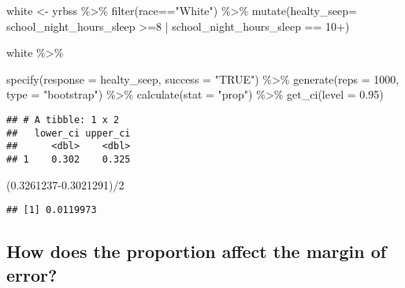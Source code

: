 \documentclass[
]{article}
\newenvironment{Shaded}{\begin{snugshade}}{\end{snugshade}}
\newcommand{\AttributeTok}[1]{\textcolor[rgb]{0.77,0.63,0.00}{#1}}
\newcommand{\DecValTok}[1]{\textcolor[rgb]{0.00,0.00,0.81}{#1}}
\newcommand{\FloatTok}[1]{\textcolor[rgb]{0.00,0.00,0.81}{#1}}
\newcommand{\FunctionTok}[1]{\textcolor[rgb]{0.00,0.00,0.00}{#1}}
\newcommand{\NormalTok}[1]{#1}
\newcommand{\OtherTok}[1]{\textcolor[rgb]{0.56,0.35,0.01}{#1}}
\newcommand{\SpecialCharTok}[1]{\textcolor[rgb]{0.00,0.00,0.00}{#1}}
\newcommand{\StringTok}[1]{\textcolor[rgb]{0.31,0.60,0.02}{#1}}
\begin{document}
\begin{Shaded}
\begin{Highlighting}[]
\NormalTok{white }\OtherTok{\textless{}{-}}\NormalTok{  yrbss }\SpecialCharTok{\%\textgreater{}\%}
  \FunctionTok{filter}\NormalTok{(race}\SpecialCharTok{==}\StringTok{"White"}\NormalTok{) }\SpecialCharTok{\%\textgreater{}\%} 
  \FunctionTok{mutate}\NormalTok{(}\AttributeTok{healty\_seep=}\NormalTok{ school\_night\_hours\_sleep }\SpecialCharTok{\textgreater{}=}\DecValTok{8} \SpecialCharTok{|}\NormalTok{ school\_night\_hours\_sleep }\SpecialCharTok{==} \StringTok{\textquotesingle{}10+\textquotesingle{}}\NormalTok{)}
  
\NormalTok{white }\SpecialCharTok{\%\textgreater{}\%}
  
\FunctionTok{specify}\NormalTok{(}\AttributeTok{response =}\NormalTok{ healty\_seep, }\AttributeTok{success =} \StringTok{"TRUE"}\NormalTok{) }\SpecialCharTok{\%\textgreater{}\%}
  \FunctionTok{generate}\NormalTok{(}\AttributeTok{reps =} \DecValTok{1000}\NormalTok{, }\AttributeTok{type =} \StringTok{"bootstrap"}\NormalTok{) }\SpecialCharTok{\%\textgreater{}\%}
  \FunctionTok{calculate}\NormalTok{(}\AttributeTok{stat =} \StringTok{"prop"}\NormalTok{) }\SpecialCharTok{\%\textgreater{}\%}
  \FunctionTok{get\_ci}\NormalTok{(}\AttributeTok{level =} \FloatTok{0.95}\NormalTok{)}
\end{Highlighting}
\end{Shaded}

\begin{verbatim}
## # A tibble: 1 x 2
##   lower_ci upper_ci
##      <dbl>    <dbl>
## 1    0.302    0.325
\end{verbatim}

\begin{Shaded}
\begin{Highlighting}[]
\NormalTok{(}\FloatTok{0.3261237{-}0.3021291}\NormalTok{)}\SpecialCharTok{/}\DecValTok{2}
\end{Highlighting}
\end{Shaded}

\begin{verbatim}
## [1] 0.0119973
\end{verbatim}

\hypertarget{how-does-the-proportion-affect-the-margin-of-error}{%
\subsection{How does the proportion affect the margin of
error?}\label{how-does-the-proportion-affect-the-margin-of-error}}
\end{document}

